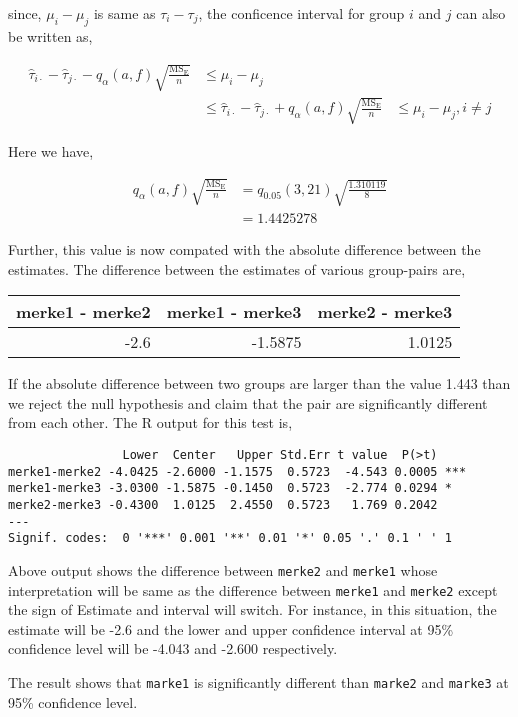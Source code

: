\documentclass[11pt,a4paper]{article}
\begin{document}
\begin{enumerate}
  since, \(\mu_i - \mu_j\) is same as \(\tau_i - \tau_j\), the
  conficence interval for group \(i\) and \(j\) can also be written as,

  \[
  \begin{aligned}
  \hat{\tau}_{i\cdot} - \hat{\tau}_{j\cdot} - q_\alpha (a, f)\sqrt{\frac{\text{MS}_\text{E}}{n}} &\le \mu_i - \mu_j\\
  & \le \hat{\tau}_{i\cdot} - \hat{\tau}_{j\cdot} + q_\alpha (a, f)\sqrt{\frac{\text{MS}_\text{E}}{n}} &\le \mu_i - \mu_j, i \ne j
  \label{eqn:tukeyCI}
  \end{aligned}
  \]

  Here we have,

  \[
  \begin{aligned}
  q_\alpha (a, f)\sqrt{\frac{\text{MS}_\text{E}}{n}} &= q_{0.05} (3, 21)\sqrt{\frac{1.310119}{8}} \\
  &= 1.4425278
  \label{eqn:tukeyCriteria}
  \end{aligned}
  \]

  Further, this value is now compated with the absolute difference
  between the estimates. The difference between the estimates of various
  group-pairs are,

  \begin{longtable}[c]{@{}rrr@{}}
  \toprule
  merke1 - merke2 & merke1 - merke3 & merke2 - merke3\tabularnewline
  \midrule
  \endhead
  -2.6 & -1.5875 & 1.0125\tabularnewline
  \bottomrule
  \end{longtable}

  If the absolute difference between two groups are larger than the
  value 1.443 than we reject the null hypothesis and claim that the pair
  are significantly different from each other. The R output for this
  test is,

\begin{verbatim}
                Lower  Center   Upper Std.Err t value  P(>t)    
merke1-merke2 -4.0425 -2.6000 -1.1575  0.5723  -4.543 0.0005 ***
merke1-merke3 -3.0300 -1.5875 -0.1450  0.5723  -2.774 0.0294 *  
merke2-merke3 -0.4300  1.0125  2.4550  0.5723   1.769 0.2042    
---
Signif. codes:  0 '***' 0.001 '**' 0.01 '*' 0.05 '.' 0.1 ' ' 1
\end{verbatim}

  Above output shows the difference between \texttt{merke2} and
  \texttt{merke1} whose interpretation will be same as the difference
  between \texttt{merke1} and \texttt{merke2} except the sign of
  Estimate and interval will switch. For instance, in this situation,
  the estimate will be -2.6 and the lower and upper confidence interval
  at 95\% confidence level will be -4.043 and -2.600 respectively.

  The result shows that \texttt{marke1} is significantly different than
  \texttt{marke2} and \texttt{marke3} at 95\% confidence level.
\end{enumerate}
\end{document}
